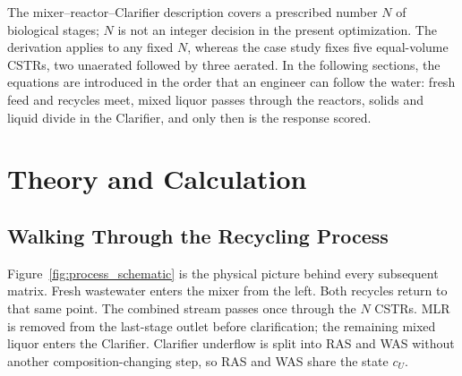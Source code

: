 \documentclass[a4paper,fleqn]{cas-sc}
\begin{document}
The mixer--reactor--Clarifier description covers a prescribed number $N$ of biological stages; $N$ is not an integer decision in the present optimization. The derivation applies to any fixed $N$, whereas the case study fixes five equal-volume CSTRs, two unaerated followed by three aerated. In the following sections, the equations are introduced in the order that an engineer can follow the water: fresh feed and recycles meet, mixed liquor passes through the reactors, solids and liquid divide in the Clarifier, and only then is the response scored.

\section{Theory and Calculation}

\subsection{Walking Through the Recycling Process}

Figure~\ref{fig:process_schematic} is the physical picture behind every subsequent matrix. Fresh wastewater enters the mixer from the left. Both recycles return to that same point. The combined stream passes once through the $N$ CSTRs. MLR is removed from the last-stage outlet before clarification; the remaining mixed liquor enters the Clarifier. Clarifier underflow is split into RAS and WAS without another composition-changing step, so RAS and WAS share the state $c_U$.
\end{document}
